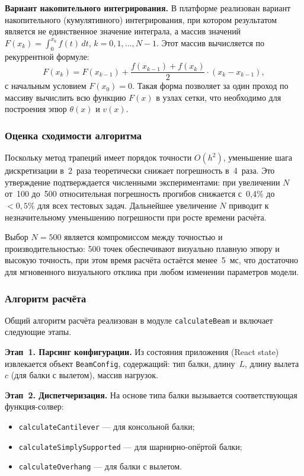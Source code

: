 \textbf{Вариант накопительного интегрирования.} В платформе реализован вариант накопительного (кумулятивного) интегрирования, при котором результатом является не единственное значение интеграла, а массив значений $F(x_k) = \int_0^{x_k} f(t) \, dt$, $k = 0, 1, \ldots, N-1$. Этот массив вычисляется по рекуррентной формуле:
\begin{equation}
  F(x_k) = F(x_{k-1}) + \frac{f(x_{k-1}) + f(x_k)}{2} \cdot (x_k - x_{k-1}),
  \label{eq:trapz_cumulative}
\end{equation}
с начальным условием $F(x_0) = 0$. Такая форма позволяет за один проход по массиву вычислить всю функцию $F(x)$ в узлах сетки, что необходимо для построения эпюр $\theta(x)$ и $v(x)$.

\subsubsection{Оценка сходимости алгоритма}

Поскольку метод трапеций имеет порядок точности $O(h^2)$, уменьшение шага дискретизации в~2~раза теоретически снижает погрешность в~4~раза. Это утверждение подтверждается численными экспериментами: при увеличении $N$ от~100 до~500 относительная погрешность прогибов снижается с~0{,}4\% до $<0{,}5\%$ для всех тестовых задач. Дальнейшее увеличение $N$ приводит к незначительному уменьшению погрешности при росте времени расчёта.

Выбор $N = 500$ является компромиссом между точностью и производительностью: 500 точек обеспечивают визуально плавную эпюру и высокую точность, при этом время расчёта остаётся менее~5~мс, что достаточно для мгновенного визуального отклика при любом изменении параметров модели.

\subsubsection{Алгоритм расчёта}

Общий алгоритм расчёта реализован в модуле \texttt{calculateBeam} и включает следующие этапы.

\textbf{Этап~1. Парсинг конфигурации.} Из состояния приложения (React state) извлекается объект \texttt{BeamConfig}, содержащий: тип балки, длину~$L$, длину вылета~$c$ (для балки с вылетом), массив нагрузок.

\textbf{Этап~2. Диспетчеризация.} На основе типа балки вызывается соответствующая функция-солвер:
\begin{itemize}
  \item \texttt{calculateCantilever} --- для консольной балки;
  \item \texttt{calculateSimplySupported} --- для шарнирно-опёртой балки;
  \item \texttt{calculateOverhang} --- для балки с вылетом.
\end{itemize}

